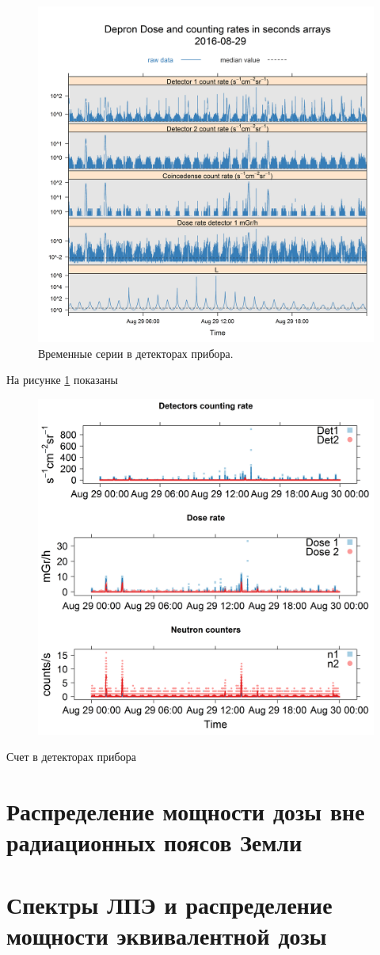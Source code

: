 \begin{figure}
	\centering
	\includegraphics[width=0.7\linewidth]{images/results/depron_sec_log08-29-16}
	\caption{Временные серии в детекторах прибора.}
	\label{fig:depronseclog08-29-16}
\end{figure}
На рисунке \ref{fig:depronseclog08-29-16} показаны 
\begin{figure}
	\centering
	\includegraphics[width=0.7\linewidth]{images/results/depron_sec_log_new08-29-16}
	\caption{}
	\label{fig:depronseclognew08-29-16}
\end{figure}
Счет в детекторах прибора  






\section{Распределение мощности дозы вне радиационных поясов Земли}

\section{Спектры ЛПЭ и распределение мощности эквивалентной дозы}